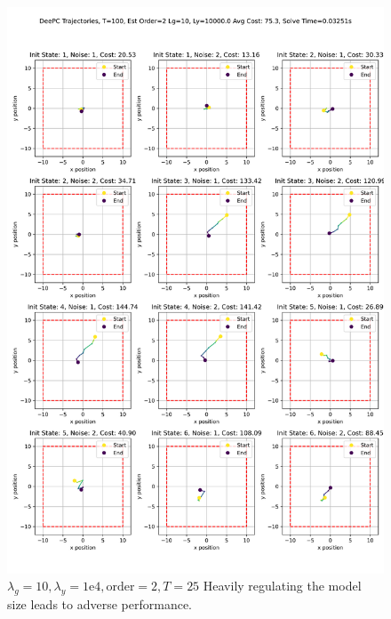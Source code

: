 \documentclass[11pt,a4paper]{article}
\begin{document}
\begin{figure}
    \centering
    \includegraphics[width=0.85\linewidth]{./figures/DeePC_trajectories_100_2_10_10000.0.png}
    \caption{$\lambda_g=10, \lambda_y=1\mathrm{e}4, \text{order}=2, T=25$ Heavily regulating the model size leads to adverse performance.}
    \label{fig:enter-label}
\end{figure}
\end{document}
